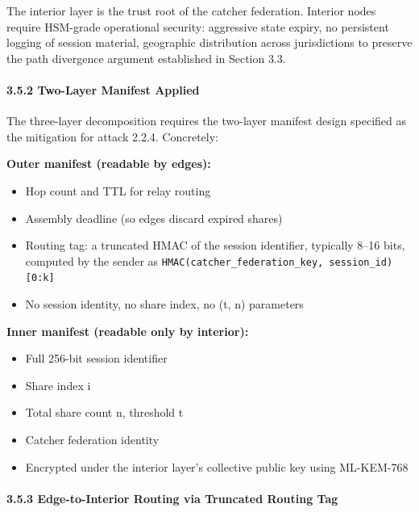 \documentclass[
  11pt,
]{article}
\providecommand{\tightlist}{%
  \setlength{\itemsep}{0pt}\setlength{\parskip}{0pt}}
\begin{document}
The interior layer is the trust root of the catcher federation. Interior
nodes require HSM-grade operational security: aggressive state expiry,
no persistent logging of session material, geographic distribution
across jurisdictions to preserve the path divergence argument
established in Section 3.3.

\hypertarget{two-layer-manifest-applied}{%
\paragraph{3.5.2 Two-Layer Manifest
Applied}\label{two-layer-manifest-applied}}

The three-layer decomposition requires the two-layer manifest design
specified as the mitigation for attack 2.2.4. Concretely:

\textbf{Outer manifest (readable by edges):}

\begin{itemize}
\tightlist
\item
  Hop count and TTL for relay routing
\item
  Assembly deadline (so edges discard expired shares)
\item
  Routing tag: a truncated HMAC of the session identifier, typically
  8--16 bits, computed by the sender as
  \texttt{HMAC(catcher\_federation\_key,\ session\_id){[}0:k{]}}
\item
  No session identity, no share index, no (t, n) parameters
\end{itemize}

\textbf{Inner manifest (readable only by interior):}

\begin{itemize}
\tightlist
\item
  Full 256-bit session identifier
\item
  Share index i
\item
  Total share count n, threshold t
\item
  Catcher federation identity
\item
  Encrypted under the interior layer's collective public key using
  ML-KEM-768
\end{itemize}

\hypertarget{edge-to-interior-routing-via-truncated-routing-tag}{%
\paragraph{3.5.3 Edge-to-Interior Routing via Truncated Routing
Tag}\label{edge-to-interior-routing-via-truncated-routing-tag}}
\end{document}
